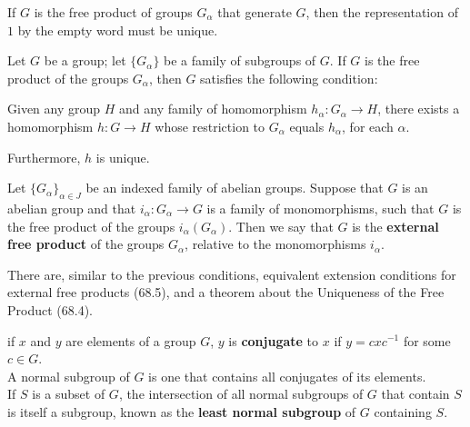 \begin{remark}
If $G$ is the free product of groups $G_\alpha$ that generate $G$, then the representation of $1$ by the empty word must be unique.
\end{remark}

\begin{lemma}
Let $G$ be a group; let $\{ G_\alpha \}$ be a family of subgroups of $G$. If $G$ is the free product of the groups $G_\alpha$, then $G$ satisfies the following condition: \\ 
    
\begin{addmargin}{1em}
    Given any group $H$ and any family of homomorphism $h_\alpha \colon G_\alpha \rightarrow H$, there exists a homomorphism $h \colon G \rightarrow H$ whose restriction to $G_\alpha$ equals $h_\alpha$, for each $\alpha$. \\
\end{addmargin}

Furthermore, $h$ is unique.
\end{lemma}

\begin{definition}
    Let $\{ G_\alpha \}_{\alpha \in J}$ be an indexed family of abelian groups. Suppose that $G$ is an abelian group and that $i_\alpha \colon G_\alpha \rightarrow G$ is a family of monomorphisms,
    such that $G$ is the free product of the groups $i_\alpha(G_\alpha)$. Then we say that $G$ is the \textbf{external free product} of the groups $G_\alpha$, relative to the monomorphisms $i_\alpha$. 
\end{definition}

There are, similar to the previous conditions, equivalent extension conditions for external free products (68.5), and a theorem about the Uniqueness of the Free Product (68.4).

\begin{definition}
if $x$ and $y$ are elements of a group $G$, $y$ is \textbf{conjugate} to $x$ if $y = cxc^{-1}$ for some $c \in G$. \\

A normal subgroup of $G$ is one that contains all conjugates of its elements. \\

If $S$ is a subset of $G$, the intersection of all normal subgroups of $G$ that contain $S$ is itself a subgroup, known as the \textbf{least normal subgroup} of $G$ containing $S$.
\end{definition}

